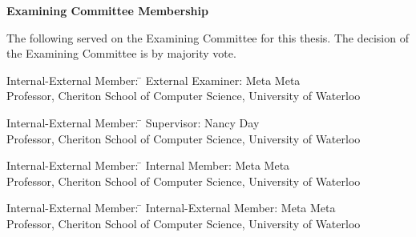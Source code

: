 \cleardoublepage %
 
\begin{center}\textbf{Examining Committee Membership}\end{center}
  \noindent
The following served on the Examining Committee for this thesis. The decision of the Examining Committee is by majority vote.
  \bigskip
  
  \noindent
\begin{tabbing}
Internal-External Member: \=  \kill %
External Examiner: \>  Meta Meta \\ 
\> Professor, Cheriton School of Computer Science, University of Waterloo \\
\end{tabbing} 
  \bigskip
  
  \noindent
\begin{tabbing}
Internal-External Member: \=  \kill %
Supervisor: \> Nancy Day \\
\> Professor, Cheriton School of Computer Science, University of Waterloo \\
\end{tabbing}
  \bigskip
  
  \noindent
  \begin{tabbing}
Internal-External Member: \=  \kill %
Internal Member: \> Meta Meta \\
\> Professor, Cheriton School of Computer Science, University of Waterloo \\
\end{tabbing}
  \bigskip
  
  \noindent
\begin{tabbing}
Internal-External Member: \=  \kill %
Internal-External Member: \> Meta Meta \\
\> Professor, Cheriton School of Computer Science, University of Waterloo \\
\end{tabbing}
  \bigskip
  
